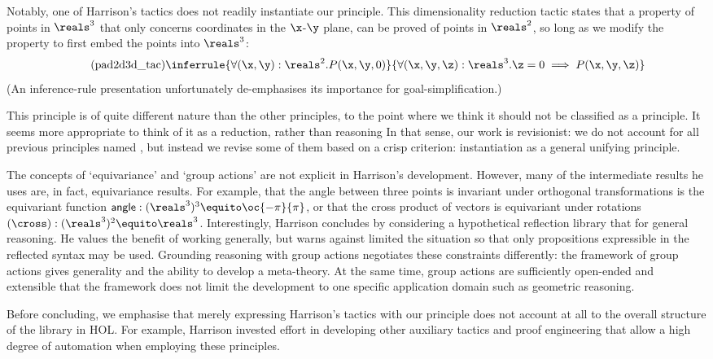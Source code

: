 Notably, one of Harrison's tactics does not readily instantiate
our \WLOG{} principle.
This dimensionality reduction tactic states that a property of points
in $\reals^3$ that only concerns coordinates in the $\x$-$\y$ plane,
can be proved \WLOG{} of points in $\reals^2$, so long as we modify the
property to first embed the points into $\reals^3$:
\[
\tag{pad2d3d\_tac}
\inferrule{
  \forall (\x,\y) : \reals^2. P(\x,\y,0)
}{
  \forall (\x,\y,\z) : \reals^3. \z = 0 \implies P(\x,\y,\z)
}
\]
(An inference-rule presentation unfortunately de-emphasises its
importance for goal-simplification.)

This principle is of quite different nature than the other \WLOG{}
principles, to the point where we think it should not be classified
as a \WLOG{} principle. It seems more appropriate to think of it as
a reduction, rather than reasoning \WLOG{}
In that sense, our work is
revisionist: we do not account for all previous principles named \WLOG{},
but instead we revise some of them based on a crisp criterion:
instantiation as a general unifying \WLOG{} principle.

The concepts of `equivariance' and `group actions' are not explicit in
Harrison's development. However, many of the intermediate results he
uses are, in fact, equivariance results. For example, that the angle
between three points is invariant under orthogonal transformations is
the equivariant function $\mathsf{angle} : (\reals^3)^3 \equito
\oc{-\pi}{\pi}$, or that the cross product of vectors is equivariant
under rotations $(\cross) : (\reals^3)^2 \equito
\reals^3$. Interestingly, Harrison concludes by considering a hypothetical
reflection library that for general
\WLOG{} reasoning. He values the benefit of
working generally, but warns against limited the situation so that
only propositions expressible in the reflected syntax may be
used. Grounding \WLOG{} reasoning with group actions negotiates these
constraints differently: the framework of group actions gives
generality and the ability to develop a meta-theory. At the same time, group actions
are sufficiently open-ended and extensible that the framework does not limit the
development to one specific application domain such as geometric
reasoning.

Before concluding, we emphasise that merely expressing Harrison's \WLOG{}
tactics with our \WLOG{} principle does not account at all to the overall
structure of the \WLOG{} library in HOL. For example, Harrison invested
effort in developing other auxiliary tactics and proof engineering
that allow a high degree of automation when employing these
principles.

